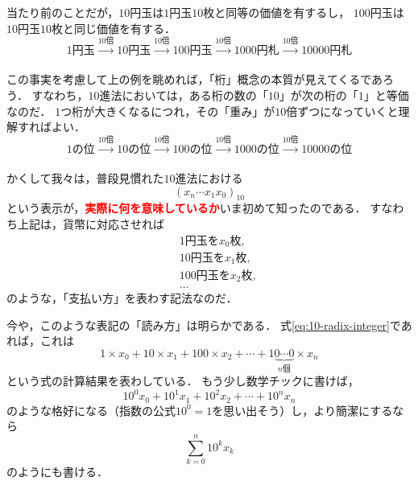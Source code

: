 \documentclass[a5j, uplatex, dvipdfmx]{jsbook}
\newcommand{\emphasize}[1]{\textcolor{red}{\textbf{#1}}}
\begin{document}
    当たり前のことだが，$10$円玉は$1$円玉$10$枚と同等の価値を有するし，
    $100$円玉は$10$円玉$10$枚と同じ価値を有する．
    \begin{equation*}
        1円玉 \xrightarrow[]{10倍} 10円玉 \xrightarrow[]{10倍} 100円玉 \xrightarrow[]{10倍} 1000円札 \xrightarrow[]{10倍} 10000円札
    \end{equation*}

    この事実を考慮して上の例を眺めれば，「桁」概念の本質が見えてくるであろう．
    すなわち，$10$進法においては，ある桁の数の「$10$」が次の桁の「$1$」と等価なのだ．
    $1$つ桁が大きくなるにつれ，その「重み」が$10$倍ずつになっていくと理解すればよい．
    \begin{equation*}
        1の位 \xrightarrow[]{10倍} 10の位 \xrightarrow[]{10倍} 100の位 \xrightarrow[]{10倍} 1000の位 \xrightarrow[]{10倍} 10000の位
    \end{equation*}

    かくして我々は，普段見慣れた$10$進法における
    \begin{equation}
        (x_n \cdots x_1 x_0)_{10}  \label{eq:10-radix-integer}
    \end{equation}
    という表示が，\emphasize{実際に何を意味しているか}いま初めて知ったのである．
    すなわち上記は，貨幣に対応させれば
    \begin{eqnarray*}
        &&1円玉を x_0 枚, \\
        &&10円玉を x_1 枚, \\
        &&100円玉を x_2 枚, \\
        &&...
    \end{eqnarray*}
    のような，「支払い方」を表わす記法なのだ．

    今や，このような表記の「読み方」は明らかである．
    式\eqref{eq:10-radix-integer}であれば，これは
    \begin{equation*}
        1 \times x_0 + 10 \times x_1 + 100 \times x_2 + \cdots + 1\underbrace{0\cdots 0}_{n個} \times x_n
    \end{equation*}
    という式の計算結果を表わしている．
    もう少し数学チックに書けば，
    \begin{equation*}
        10^0 x_0 + 10^1 x_1 + 10^2 x_2 + \cdots + 10^n x_n
    \end{equation*}
    のような格好になる（指数の公式$10^0 = 1$を思い出そう）し，より簡潔にするなら
    \begin{equation*}
        \sum_{k=0}^n 10^k x_k
    \end{equation*}
    のようにも書ける．
\end{document}
